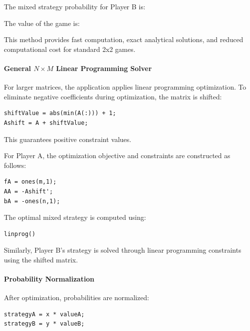 \documentclass[12pt,a4paper]{article}
\begin{document}
\noindent{}

The mixed strategy probability for Player B is:

\noindent{}

The value of the game is:

\noindent{} \cite{murthy2007}

This method provides fast computation, exact analytical solutions, and reduced computational cost for standard 2x2 games.

\paragraph{General \(N \times M\) Linear Programming Solver}

For larger matrices, the application applies linear programming optimization. To eliminate negative coefficients during optimization, the matrix is shifted:

\begin{lstlisting}[style=code]
shiftValue = abs(min(A(:))) + 1;
Ashift = A + shiftValue;
\end{lstlisting}

This guarantees positive constraint values.

For Player A, the optimization objective and constraints are constructed as follows:

\begin{lstlisting}[style=code]
fA = ones(m,1);
AA = -Ashift';
bA = -ones(n,1);
\end{lstlisting}

The optimal mixed strategy is computed using:

\begin{lstlisting}[style=code]
linprog()
\end{lstlisting}

Similarly, Player B's strategy is solved through linear programming constraints using the shifted matrix.

\paragraph{Probability Normalization}

After optimization, probabilities are normalized:

\begin{lstlisting}[style=code]
strategyA = x * valueA;
strategyB = y * valueB;
\end{lstlisting}
\end{document}

